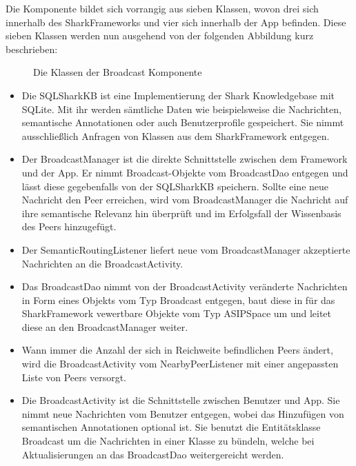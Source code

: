 Die Komponente bildet sich vorrangig aus sieben Klassen, wovon drei sich innerhalb des SharkFrameworks und vier sich innerhalb der App befinden. Diese sieben Klassen werden nun ausgehend von der folgenden Abbildung kurz beschrieben:
\begin{figure}[H]
	\centering
	\caption{Die Klassen der Broadcast Komponente}
	\label{fig:broadcastStructure}
\end{figure}
\begin{itemize}
	\item Die SQLSharkKB ist eine Implementierung der Shark Knowledgebase mit SQLite. Mit ihr werden sämtliche Daten wie beispielsweise die Nachrichten, semantische Annotationen oder auch Benutzerprofile gespeichert. Sie nimmt ausschließlich Anfragen von Klassen aus dem SharkFramework entgegen.
	\item Der BroadcastManager ist die direkte Schnittstelle zwischen dem Framework und der App. Er nimmt Broadcast-Objekte vom BroadcastDao entgegen und lässt diese gegebenfalls von der SQLSharkKB speichern. Sollte eine neue Nachricht den Peer erreichen, wird vom BroadcastManager die Nachricht auf ihre semantische Relevanz hin überprüft und im Erfolgsfall der Wissenbasis des Peers hinzugefügt.
	\item Der SemanticRoutingListener liefert neue vom BroadcastManager akzeptierte Nachrichten an die BroadcastActivity.
	\item Das BroadcastDao nimmt von der BroadcastActivity veränderte Nachrichten in Form eines Objekts vom Typ Broadcast entgegen, baut diese in für das SharkFramework vewertbare Objekte vom Typ ASIPSpace um und leitet diese an den BroadcastManager weiter.
	\item Wann immer die Anzahl der sich in Reichweite befindlichen Peers ändert, wird die BroadcastActivity vom NearbyPeerListener mit einer angepassten Liste von Peers versorgt.
	\item Die BroadcastActivity ist die Schnittstelle zwischen Benutzer und App. Sie nimmt neue Nachrichten vom Benutzer entgegen, wobei das Hinzufügen von semantischen Annotationen optional ist. Sie benutzt die Entitätsklasse Broadcast um die Nachrichten in einer Klasse zu bündeln, welche bei Aktualisierungen an das BroadcastDao weitergereicht werden.\\
\end{itemize}

